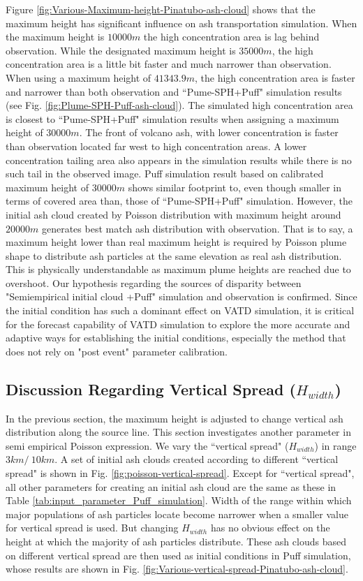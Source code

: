 \documentclass[draft,linenumbers]{agujournal2019}
\begin{document}
Figure \ref{fig:Various-Maximum-height-Pinatubo-ash-cloud} shows that the maximum height has significant influence on ash transportation simulation. When the maximum height is $10000 m$ the high concentration area is lag behind observation. While the designated maximum height is $35000 m$, the high concentration area is a little bit faster and much narrower than observation. When using a maximum height of $41343.9 m$, the high concentration area is faster and narrower than both observation and ``Pume-SPH+Puff" simulation results (see Fig. \ref{fig:Plume-SPH-Puff-ash-cloud}). The simulated high concentration area is closest to ``Pume-SPH+Puff" simulation results when assigning a maximum height of $30000 m$. The front of volcano ash, with lower concentration is faster than observation located far west to high concentration areas. A lower concentration tailing area also appears in the simulation results while there is no such tail in the observed image. Puff simulation result based on calibrated maximum height of $30000 m$ shows similar footprint to, even though smaller in terms of covered area than, those of ``Pume-SPH+Puff" simulation. However, the initial ash cloud created by Poisson distribution with maximum height around $20000 m$ generates best match ash distribution with observation. That is to say, a maximum height lower than real maximum height is required by Poisson plume shape to distribute ash particles at the same elevation as real ash distribution. This is physically understandable as maximum plume heights are reached due to overshoot.
Our hypothesis regarding the sources of disparity between "Semiempirical initial cloud +Puff" simulation and observation is confirmed. Since the initial condition has such a dominant effect on VATD simulation, it is critical for the forecast capability of VATD simulation to explore the more accurate and adaptive ways for establishing the initial conditions, especially the method that does not rely on "post event" parameter calibration.

\subsection{Discussion Regarding Vertical Spread ($H_{width}$)}
In the previous section, the maximum height is adjusted to change vertical ash distribution along the source line. This section investigates another parameter in semi empirical Poisson expression. We vary the ``vertical spread" ($H_{width}$) in range $3 km /~ 10 km$. A set of initial ash clouds created according to different ``vertical spread" is shown in Fig. \ref{fig:poisson-vertical-spread}. Except for ``vertical spread", all other parameters for creating an initial ash cloud are the same as these in Table \ref{tab:input_parameter_Puff_simulation}. Width of the range within which major populations of ash particles locate become narrower when a smaller value for vertical spread is used. But changing $H_{width}$ has no obvious effect on the height at which the majority of ash particles distribute. These ash clouds based on different vertical spread are then used as initial conditions in Puff simulation, whose results are shown in Fig. \ref{fig:Various-vertical-spread-Pinatubo-ash-cloud}.
\end{document}
